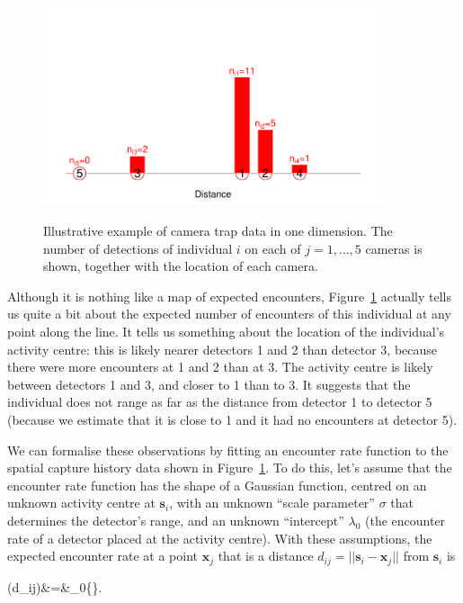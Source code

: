\begin{figure}[ht]
\caption{\small Illustrative example of camera trap data in one dimension. The number of detections of individual $i$ on each of $j=1,\ldots,5$ cameras is shown, together with the location of each camera.}
\centering
\vspace{-24pt}
\includegraphics[width=10cm]{keepfigure/ObsN.pdf}
\label{fig:ER+detfun_enc}
\end{figure}

Although it is nothing like a map of expected encounters, Figure~\ref{fig:ER+detfun_enc} actually tells us quite a bit about the expected number of encounters of this individual at any point along the line. It tells us something about the location of the individual's activity centre: this is likely nearer detectors 1 and 2 than detector 3, because there were more encounters at 1 and 2 than at 3. The activity centre is likely between detectors 1 and 3, and closer to 1 than to 3. It suggests that the individual does not range as far as the distance from detector 1 to detector 5 (because we estimate that it is close to 1 and it had no encounters at detector 5). 

We can formalise these observations by fitting an encounter rate function to the spatial capture history data shown in Figure~\ref{fig:ER+detfun_enc}. To do this, let's assume that the encounter rate function has the shape of a Gaussian function, centred on an unknown activity centre at $\bm{s}_i$, with an unknown ``scale parameter'' $\sigma$ that determines the detector's range, and an unknown ``intercept'' $\lambda_0$ (the encounter rate of a detector placed at the activity centre). With these assumptions, the expected encounter rate at a point $\bm{x}_j$ that is a distance $d_{ij}=||\bm{s}_i-\bm{x}_j||$ from $\bm{s}_i$ is

\be
\lambda(d_{ij})&=&\lambda_0\exp\left\{\right\}.
\label{eq:ER+detfun.lambda.hn}
\ee

